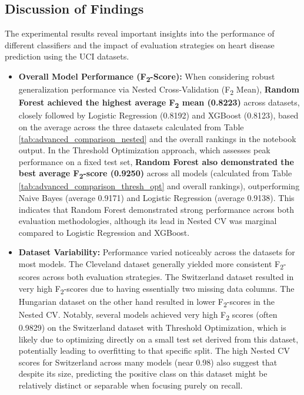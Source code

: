 \documentclass{article}
\begin{document}
\subsection{Discussion of Findings}
\label{sec:discussion} %

The experimental results reveal important insights into the performance of different classifiers and the impact of evaluation strategies on heart disease prediction using the UCI datasets.

\begin{itemize}
    \item \textbf{Overall Model Performance (F\textsubscript{2}-Score):} When considering robust generalization performance via Nested Cross-Validation (F\textsubscript{2} Mean), \textbf{Random Forest achieved the highest average F\textsubscript{2} mean (0.8223)} across datasets, closely followed by Logistic Regression (0.8192) and XGBoost (0.8123), based on the average across the three datasets calculated from Table \ref{tab:advanced_comparison_nested} and the overall rankings in the notebook output. In the Threshold Optimization approach, which assesses peak performance on a fixed test set, \textbf{Random Forest also demonstrated the best average F\textsubscript{2}-score (0.9250)} across all models (calculated from Table \ref{tab:advanced_comparison_thresh_opt} and overall rankings), outperforming Naive Bayes (average 0.9171) and Logistic Regression (average 0.9138). This indicates that Random Forest demonstrated strong performance across both evaluation methodologies, although its lead in Nested CV was marginal compared to Logistic Regression and XGBoost.
    \item \textbf{Dataset Variability:} Performance varied noticeably across the datasets for most models. The Cleveland dataset generally yielded more consistent F\textsubscript{2}-scores across both evaluation strategies. The Switzerland dataset resulted in very high F\textsubscript{2}-scores due to having essentially two missing data columns. The Hungarian dataset on the other hand resulted in lower F\textsubscript{2}-scores in the Nested CV. Notably, several models achieved very high F\textsubscript{2} scores (often 0.9829) on the Switzerland dataset with Threshold Optimization, which is likely due to optimizing directly on a small test set derived from this dataset, potentially leading to overfitting to that specific split. The high Nested CV scores for Switzerland across many models (near 0.98) also suggest that despite its size, predicting the positive class on this dataset might be relatively distinct or separable when focusing purely on recall.

\end{itemize}
\end{document}
